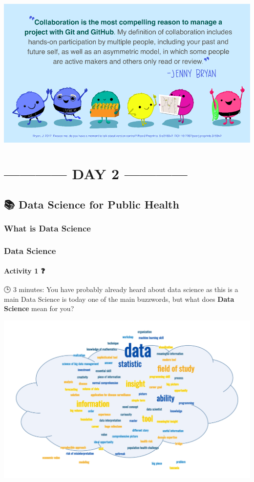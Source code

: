 \documentclass[
  letterpaper,
  DIV=11,
  numbers=noendperiod,
  oneside]{scrreprt}
\begin{document}
\includegraphics{images/paste-ADC9719C.png}

\part{------------ DAY 2 ------------}

\hypertarget{data-science-for-public-health}{%
\chapter{\texorpdfstring{{📚} Data Science for Public
Health}{📚 Data Science for Public Health}}\label{data-science-for-public-health}}

\hypertarget{what-is-data-science}{%
\section{What is Data Science}\label{what-is-data-science}}

\hypertarget{data-science}{%
\section{Data Science}\label{data-science}}

\subsection{\texorpdfstring{Activity 1 {❓}}{Activity 1 ❓}}

{🕒} 3 minutes: You have probably already heard about data science as
this is a main Data Science is today one of the main buzzwords, but what
does \textbf{Data Science} mean for you?

\includegraphics{images/paste-4EA2A26C.png}
\end{document}
